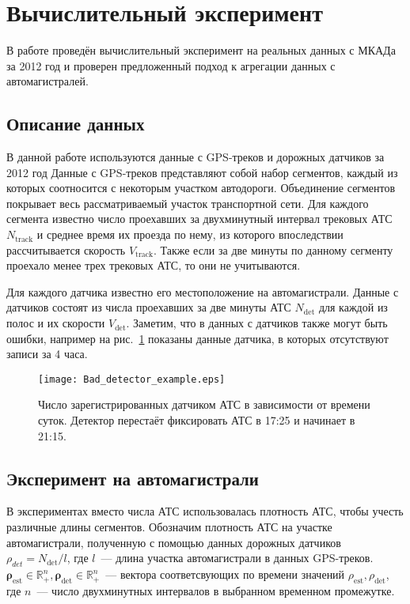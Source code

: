 \section{Вычислительный эксперимент}
\label{sec::experiments}
В работе проведён вычислительный эксперимент на реальных данных с МКАДа за 2012 год и проверен предложенный подход к агрегации данных с автомагистралей.

\subsection{Описание данных}
В данной работе используются данные с GPS-треков и дорожных датчиков за 2012 год
Данные с GPS-треков представляют собой набор сегментов, каждый из которых соотносится с некоторым участком автодороги.
Объединение сегментов покрывает весь рассматриваемый участок транспортной сети.
Для каждого сегмента известно число проехавших за двухминутный интервал трековых АТС $N_\text{track}$ и среднее время их проезда по нему, из которого впоследствии рассчитывается скорость $V_\text{track}$.
Также если за две минуты по данному сегменту проехало менее трех трековых АТС, то они не учитываются.

Для каждого датчика известно его местоположение на автомагистрали.
Данные с датчиков состоят из числа проехавших за две минуты АТС $N_\text{det}$ для каждой из полос и их скорости $V_\text{det}$.
Заметим, что в данных с датчиков также могут быть ошибки, например на рис.~\ref{fig:baddet} показаны данные датчика, в которых отсутствуют записи за 4 часа.
\begin{figure}[!ht]
\begin{center}
\texttt{[image: Bad\_detector\_example.eps]}
\caption{Число зарегистрированных датчиком АТС в зависимости от времени суток. Детектор перестаёт фиксировать АТС в 17:25 и начинает в 21:15.}
\label{fig:baddet}
\end{center}
\end{figure}


\subsection{Эксперимент на автомагистрали}
В экспериментах вместо числа АТС использовалась плотность АТС, чтобы учесть различные длины сегментов.
Обозначим плотность АТС на участке автомагистрали, полученную с помощью данных дорожных датчиков $\rho_{det} = N_\text{det} / l$, где $l$~--- длина участка автомагистрали в данных GPS-треков.
$\boldsymbol{\rho}_\text{est} \in \mathbb{R}_{+}^{n}, \boldsymbol{\rho}_\text{det} \in \mathbb{R}_{+}^{n}$~--- вектора соответсвующих по времени значений $\rho_\text{est}, \rho_\text{det}$, где $n$~--- число двухминутных интервалов в выбранном временном промежутке.

